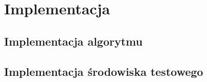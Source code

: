 \section{Implementacja}

\subsection{Implementacja algorytmu}



\subsection{Implementacja środowiska testowego}
